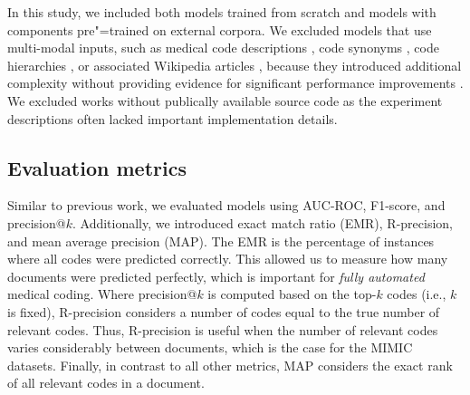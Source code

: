 {In this study, we included both models trained from scratch and models with components pre"=trained on external corpora. 
We excluded models that use multi-modal inputs, such as medical code descriptions \parencite{kimReadAttendCode2021, mullenbachExplainablePredictionMedical2018, vuLabelAttentionModel2020, caoHyperCoreHyperbolicCograph2020, baoMedicalCodePrediction2021}, code synonyms \parencite{yuanCodeSynonymsMatter2022}, code hierarchies \parencite{caoHyperCoreHyperbolicCograph2020, xieEHRCodingMultiscale2019}, or associated Wikipedia articles \parencite{baiImprovingMedicalCode2019}, because they introduced additional complexity without providing evidence for significant performance improvements \parencite{mullenbachExplainablePredictionMedical2018, vuLabelAttentionModel2020, tengReviewDeepNeural2022}. We excluded works without publically available source code as the experiment descriptions often lacked important implementation details.

\subsection{Evaluation metrics}
\label{sec:metrics}
Similar to previous work, we evaluated models using AUC-ROC, F1-score, and precision@$k$. Additionally, we introduced exact match ratio (EMR), R-precision, and mean average precision (MAP). The EMR is the percentage of instances where all codes were predicted correctly. This allowed us to measure how many documents were predicted perfectly, which is important for \textit{fully automated} medical coding.
Where precision@$k$ is computed based on the top-$k$ codes (i.e., $k$ is fixed), R-precision considers a number of codes equal to the true number of relevant codes. Thus, R-precision is useful when the number of relevant codes varies considerably between documents, which is the case for the MIMIC datasets. Finally, in contrast to all other metrics, MAP considers the exact rank of all relevant codes in a document.


}
